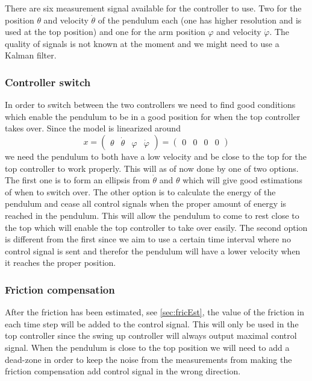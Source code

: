 \documentclass[10pt,a4paper]{article}
\begin{document}
There are six measurement signal available for the controller to use. Two for the position $ \theta $ and velocity $ \dot{\theta} $ of the pendulum each (one has higher resolution and is used at the top position) and one for the arm position $ \varphi $ and velocity $ \dot{\varphi} $. The quality of signals is not known at the moment and we might need to use a Kalman filter.

\subsubsection{Controller switch}
In order to switch between the two controllers we need to find good conditions which enable the pendulum to be in a good position for when the top controller takes over. Since the model is linearized around 
$$x =
\begin{pmatrix}
\theta & \dot\theta & \varphi & \dot\varphi
\end{pmatrix} = 
\begin{pmatrix}
0 & 0 & 0 & 0
\end{pmatrix}$$
we need the pendulum to both have a low velocity and be close to the top for the top controller to work properly.
This will as of now done by one of two options. The first one is to form an ellipsis from $\dot\theta$ and $\theta$ which will give good estimations of when to switch over. The other option is to calculate the energy of the pendulum and cease all control signals when the proper amount of energy is reached in the pendulum. This will allow the pendulum to come to rest close to the top which will enable the top controller to take over easily. The second option is different from the first since we aim to use a certain time interval where no control signal is sent and therefor the pendulum will have a lower velocity when it reaches the proper position.
\subsubsection{Friction compensation}
After the friction has been estimated, see \ref{sec:fricEst}, the value of the friction in each time step will be added to the control signal. This will only be used in the top controller since the swing up controller will always output maximal control signal. When the pendulum is close to the top position we will need to add a dead-zone in order to keep the noise from the measurements from making the friction compensation add control signal in the wrong direction.
\end{document}
